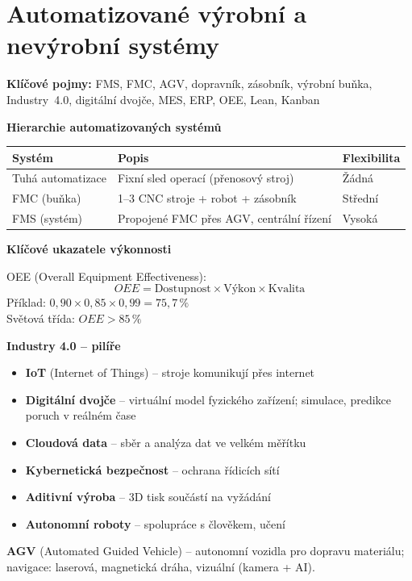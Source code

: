 \documentclass[a4paper,10pt]{article}
\begin{document}
\section{Automatizované výrobní a nevýrobní systémy}

\begin{pojmybox}
\textbf{Klíčové pojmy:}
FMS, FMC, AGV, dopravník, zásobník, výrobní buňka,
Industry~4.0, digitální dvojče, MES, ERP, OEE, Lean, Kanban
\end{pojmybox}

\begin{vysvetlenibox}
\textbf{Hierarchie automatizovaných systémů}

\begin{center}
\begin{tabularx}{0.95\linewidth}{@{} l X X @{}}
    \toprule
    \textbf{Systém} & \textbf{Popis} & \textbf{Flexibilita} \\
    \midrule
    Tuhá automatizace & Fixní sled operací (přenosový stroj) & Žádná \\
    FMC (buňka)      & 1--3 CNC stroje + robot + zásobník & Střední \\
    FMS (systém)     & Propojené FMC přes AGV, centrální řízení & Vysoká \\
    \bottomrule
\end{tabularx}
\end{center}

\textbf{Klíčové ukazatele výkonnosti}

\begin{vzorcebox}
OEE (Overall Equipment Effectiveness):
$$OEE = \text{Dostupnost} \times \text{Výkon} \times \text{Kvalita}$$
Příklad: $0{,}90 \times 0{,}85 \times 0{,}99 = 75{,}7\,\%$\\
Světová třída: $OEE > 85\,\%$
\end{vzorcebox}

\textbf{Industry 4.0 -- pilíře}
\begin{itemize}[noitemsep, leftmargin=1.4em, topsep=4pt]
    \item \textbf{IoT} (Internet of Things) -- stroje komunikují přes internet
    \item \textbf{Digitální dvojče} -- virtuální model fyzického zařízení;
          simulace, predikce poruch v reálném čase
    \item \textbf{Cloudová data} -- sběr a analýza dat ve velkém měřítku
    \item \textbf{Kybernetická bezpečnost} -- ochrana řídicích sítí
    \item \textbf{Aditivní výroba} -- 3D tisk součástí na vyžádání
    \item \textbf{Autonomní roboty} -- spolupráce s člověkem, učení
\end{itemize}

\textbf{AGV} (Automated Guided Vehicle) -- autonomní vozidla pro dopravu
materiálu; navigace: laserová, magnetická dráha, vizuální (kamera + AI).
\end{vysvetlenibox}
\end{document}
